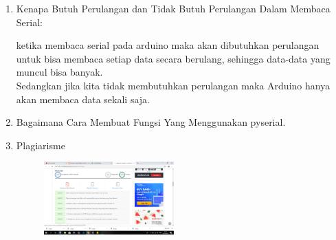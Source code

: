 \begin{enumerate}
\item Kenapa Butuh Perulangan dan Tidak Butuh Perulangan Dalam Membaca Serial:

ketika membaca serial pada arduino maka akan dibutuhkan perulangan untuk bisa membaca setiap data secara berulang, sehingga data-data yang muncul bisa banyak. \\
Sedangkan jika kita tidak membutuhkan perulangan maka Arduino hanya akan membaca data sekali saja. 

\item Bagaimana Cara Membuat Fungsi Yang Menggunakan pyserial.

\item Plagiarisme
	\begin{figure}[ht!]
	\includegraphics[width=5cm]{figures/5/1174062/8.png}
	\centering
	\end{figure}

\end{enumerate}

